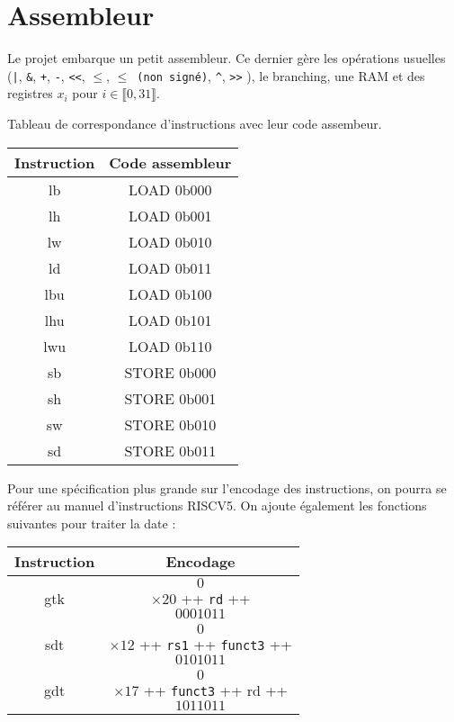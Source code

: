\documentclass{article}
\begin{document}
\newpage

\section{Assembleur}

Le projet embarque un petit assembleur. Ce dernier gère les opérations usuelles (\texttt{|}, \texttt{\&}, \texttt{+}, \texttt{-}, \texttt{<<}, \texttt{$\leq$}, \texttt{$\leq$ (non signé)}, \texttt{\^}, \texttt{>>} ), le branching, une RAM et des registres $x_i$ pour $ i \in \llbracket 0, 31 \rrbracket$. 

Tableau de correspondance d'instructions avec leur code assembeur. 

\begin{table}[h!]
\centering
\begin{tabular}{|c|c|}
\hline
\textbf{Instruction} & \textbf{Code assembleur} \\
\hline
lb   & LOAD 0b000 \\
lh   & LOAD 0b001 \\
lw   & LOAD 0b010 \\
ld   & LOAD 0b011 \\
lbu  & LOAD 0b100 \\
lhu  & LOAD 0b101 \\
lwu  & LOAD 0b110 \\
sb   & STORE 0b000 \\
sh   & STORE 0b001 \\
sw   & STORE 0b010 \\
sd   & STORE 0b011 \\
\hline
\end{tabular}
\end{table}

Pour une spécification plus grande sur l'encodage des instructions, on pourra se référer au manuel d'instructions RISCV5. On ajoute également les fonctions suivantes pour traiter la date :

\begin{table}[h!]
\centering
\begin{tabular}{|c|c|}
\hline
\textbf{Instruction} & \textbf{Encodage} \\
\hline
gtk   & \[0\] $\times 20$ ++ \texttt{rd} ++ \[0001011\] \\
sdt   & \[0\] $\times 12$ ++ \texttt{rs1} ++ \texttt{funct3} ++ \[0101011\] \\
gdt   & \[0\] $\times 17$ ++ \texttt{funct3} ++ rd ++ \[1011011\] \\
\hline
\end{tabular}
\end{table}
\end{document}
